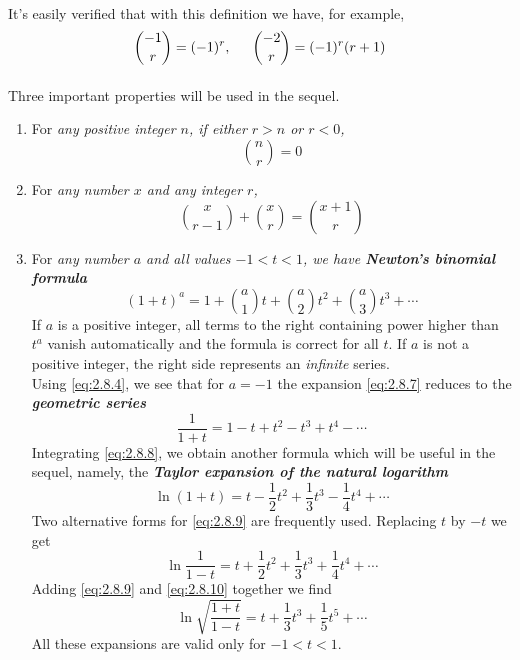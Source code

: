 \documentclass{article}
\numberwithin{equation}{subsection}
\begin{document}
			\paragraph{} It's easily verified that with this definition we have, for example,
			\begin{equation}
				\label{eq:2.8.4}
				{-1\choose r} = (-1)^r, \indent {-2\choose r} = (-1)^r(r+1)
			\end{equation}
			\paragraph{} Three important properties will be used in the sequel.
			\begin{enumerate}
			\item For \textit{any positive integer $n$, if either $r>n$ or $r<0$,} 
			\begin{equation}
				{n \choose r} = 0
			\end{equation}
			\item For \textit{any number $x$ and any integer $r$,}
			\begin{equation}
				{x \choose r-1}+{x \choose r} = {x+1 \choose r}
			\end{equation}
			\item For \textit{any number $a$ and all values $-1<t<1$, we have \textbf{Newton's binomial formula}}
			\begin{equation}
				\label{eq:2.8.7}
				(1+t)^a = 1+{a\choose 1}t+{a\choose 2}t^2+{a\choose 3}t^3+\cdots
			\end{equation} If $a$ is a positive integer, all terms to the right containing power higher than $t^a$ vanish automatically and the formula is correct for all $t$. If $a$ is not a positive integer, the right side represents an \textit{infinite} series.
			\medskip \\ Using \eqref{eq:2.8.4}, we see that for $a=-1$ the expansion \eqref{eq:2.8.7} reduces to the \textbf{\textit{geometric series}}
			\begin{equation}
				\label{eq:2.8.8}
				\frac{1}{1+t}=1-t+t^2-t^3+t^4-\cdots
			\end{equation}
			Integrating \eqref{eq:2.8.8}, we obtain another formula which will be useful in the sequel, namely, the \textbf{\textit{Taylor expansion of the natural logarithm}}
			\begin{equation}
				\label{eq:2.8.9}
				\ln(1+t)=t-\frac{1}{2}t^2+\frac{1}{3}t^3-\frac{1}{4}t^4+\cdots
			\end{equation} Two alternative forms for \eqref{eq:2.8.9} are frequently used. Replacing $t$ by $-t$ we get
			\begin{equation}
				\label{eq:2.8.10}
				\ln\frac{1}{1-t} = t + \frac{1}{2}t^2+\frac{1}{3}t^3+\frac{1}{4}t^4+\cdots
			\end{equation}
			Adding \eqref{eq:2.8.9} and \eqref{eq:2.8.10} together we find
			\begin{equation}
				\label{eq:2.8.11}
				\ln\sqrt{\frac{1+t}{1-t}}=t+\frac{1}{3}t^3+\frac{1}{5}t^5+\cdots
			\end{equation}
			All these expansions are valid only for $-1<t<1$.
			\end{enumerate}
\end{document}
